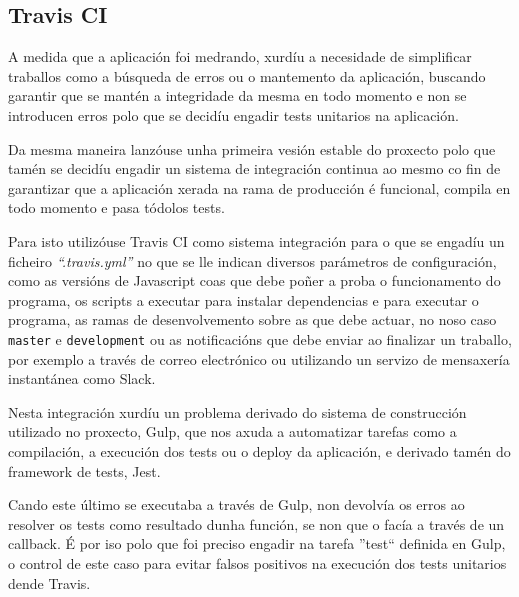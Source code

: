     \subsection{Travis CI}
    A medida que a aplicación foi medrando, xurdíu a necesidade de simplificar 
traballos como a búsqueda de erros ou o mantemento da aplicación, buscando 
garantir que se mantén a integridade da mesma en todo momento e non se 
introducen erros polo que se decidíu engadir tests unitarios na aplicación.

    Da mesma maneira lanzóuse unha primeira vesión estable do proxecto polo 
que tamén se decidíu engadir un sistema de integración continua ao mesmo co 
fin de garantizar que a aplicación xerada na rama de producción é funcional, 
compila en todo momento e pasa tódolos tests.

    Para isto utilizóuse Travis CI como sistema integración para o que se 
engadíu un ficheiro \emph{``.travis.yml''} no que se lle indican diversos 
parámetros de configuración, como as versións de Javascript coas que debe poñer 
a proba o funcionamento do programa, os scripts a executar para instalar 
dependencias e para executar o programa, as ramas de desenvolvemento sobre as 
que debe actuar, no noso caso \lstinline{master} e \lstinline{development} ou 
as notificacións 
que debe enviar ao finalizar un traballo, por exemplo a través de correo 
electrónico ou utilizando un servizo de mensaxería instantánea como Slack.

    Nesta integración xurdíu un problema derivado do sistema de construcción 
utilizado no proxecto, Gulp, que nos axuda a automatizar tarefas como a 
compilación, a execución dos tests ou o deploy da aplicación, e derivado tamén 
do framework de tests, Jest.

    Cando este último se executaba a través de Gulp, non devolvía os 
erros ao resolver os tests como resultado dunha función, se non que o facía a 
través de un callback. É por iso polo que foi preciso engadir na tarefa 
''test`` definida en Gulp, o control de este caso para evitar falsos positivos 
na execución dos tests unitarios dende Travis.
